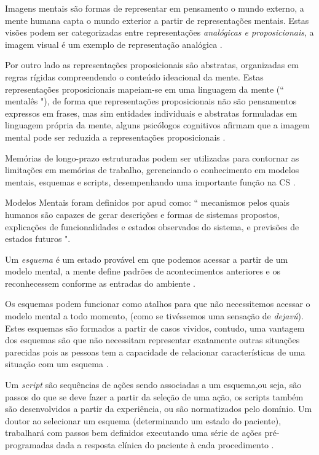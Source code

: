 \documentclass[12pt]{article}
\begin{document}
Imagens mentais são formas de representar em pensamento o mundo externo, a mente humana capta o mundo exterior a partir de representações mentais. Estas visões podem ser categorizadas entre representações \textit{analógicas e proposicionais}, a imagem visual é um exemplo de representação analógica \cite{Moreira1996}. 

Por outro lado as representações proposicionais são abstratas, organizadas em regras rígidas compreendendo o conteúdo ideacional da mente. Estas representações proposicionais mapeiam-se em uma linguagem da mente (`` mentalês "), de forma que representações proposicionais não são pensamentos expressos em frases, mas sim entidades individuais e abstratas formuladas em linguagem própria da mente, alguns psicólogos cognitivos afirmam que a imagem mental pode ser reduzida a representações proposicionais  \cite{Moreira1996}.

Memórias de longo-prazo estruturadas podem ser utilizadas para contornar as limitações em memórias de trabalho, gerenciando o conhecimento em modelos mentais, esquemas e scripts, desempenhando uma importante função na CS \cite{Endsley1995}. 

 Modelos Mentais foram definidos por \cite[p.60]{Rouse1985} apud \cite{Endsley1995} como: `` mecanismos pelos quais humanos são capazes de gerar descrições e formas de sistemas propostos, explicações de funcionalidades e estados observados do sistema, e previsões de estados futuros ".

Um \textit{esquema} é um estado provável em que podemos acessar a partir de um modelo mental, a mente define padrões de acontecimentos anteriores e os reconhecessem conforme as entradas do ambiente \cite{Endsley2012}. 

Os esquemas podem funcionar como atalhos para que não necessitemos acessar o modelo mental a todo momento, (como se tivéssemos uma sensação de \textit{dejavú}). Estes esquemas são formados a partir de casos vividos, contudo, uma vantagem dos esquemas são que não necessitam representar exatamente outras situações parecidas pois as pessoas tem a capacidade de relacionar características de uma situação com um esquema \cite{Endsley2012}.

Um \textit{script} são sequências de ações sendo associadas a um esquema,ou seja, são passos do que se deve fazer a partir da seleção de uma ação, os scripts também são desenvolvidos a partir da experiência, ou são normatizados pelo domínio. Um doutor ao selecionar um esquema (determinando um estado do paciente), trabalhará com passos bem definidos executando uma série de ações pré-programadas dada a resposta clínica do paciente à cada procedimento \cite{Endsley2012}.  
\end{document}
